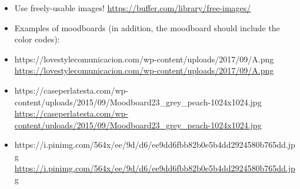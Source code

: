 \begin{itemize}
\item Use freely-usable images! \url{https://buffer.com/library/free-images/}
\item Examples of moodboards (in addition, the moodboard should include the color codes): 
\item https://lovestylecomunicacion.com/wp-content/uploads/2017/09/A.png \url{https://lovestylecomunicacion.com/wp-content/uploads/2017/09/A.png} 
\item https://caseperlatesta.com/wp-content/uploads/2015/09/Moodboard23\_grey\_peach-1024x1024.jpg \url{https://caseperlatesta.com/wp-content/uploads/2015/09/Moodboard23_grey_peach-1024x1024.jpg} 
\item https://i.pinimg.com/564x/ee/9d/d6/ee9dd6fbb82b0e5b4dd2924580b765dd.jpg \url{https://i.pinimg.com/564x/ee/9d/d6/ee9dd6fbb82b0e5b4dd2924580b765dd.jpg}
\end{itemize}

